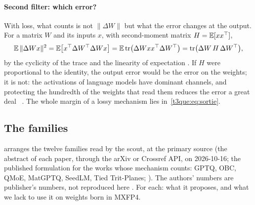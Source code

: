\paragraph{Second filter: which error?} With loss, what counts is not $\|\Delta W\|$ but what the error changes at the output. For a matrix $W$ and its inputs $x$, with second-moment matrix $H = \mathbb{E}[x x^\top]$,
\begin{equation}\label{t3que:eq:sortie}
\mathbb{E}\,\|\Delta W x\|^2 = \mathbb{E}\bigl[x^\top \Delta W^\top \Delta W x\bigr] = \mathbb{E}\,\mathrm{tr}\bigl(\Delta W x x^\top \Delta W^\top\bigr) = \mathrm{tr}\bigl(\Delta W\, H\, \Delta W^\top\bigr),
\end{equation}
by the cyclicity of the trace and the linearity of expectation \calc. If $H$ were proportional to the identity, the output error would be the error on the weights; it is not: the activations of language models have dominant channels, and protecting the hundredth of the weights that read them reduces the error a great deal~\cite{lin2023awq} \litt. The whole margin of a lossy mechanism lies in~\eqref{t3que:eq:sortie}.

\subsection{The families}

 arranges the twelve families read by the scout, at the primary source (the abstract of each paper, through the arXiv or Crossref API, on 2026-10-16; the published formulation for the works whose mechanism counts: GPTQ, OBC, QMoE, MatGPTQ, SeedLM, Tied Trit-Planes; ). The authors' numbers are publisher's numbers, not reproduced here \litt. For each: what it proposes, and what we lack to use it on weights born in MXFP4.

